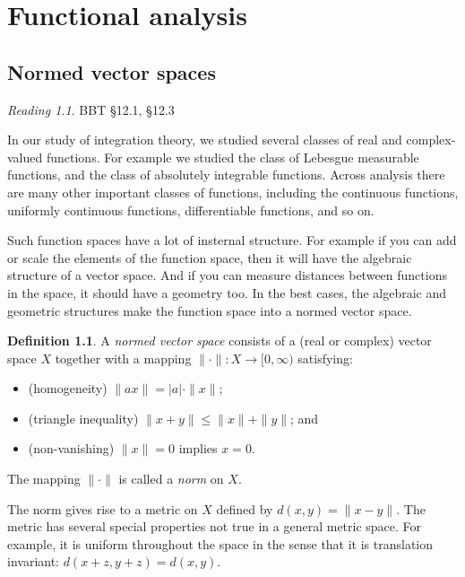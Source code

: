 \documentclass[11pt,oneside]{amsbook}
\theoremstyle{definition}
\theoremstyle{plain}
\theoremstyle{definition}
\newtheorem{defn}[thm]{Definition}
\theoremstyle{remark}
\newtheorem*{reading}{Reading}
\numberwithin{equation}{section}
\numberwithin{figure}{section}
\begin{document}
\chapter{Functional analysis}

\section{Normed vector spaces}

\begin{reading}
  BBT \S 12.1, \S 12.3
\end{reading}

In our study of integration theory, we studied several classes of real and complex-valued functions. For example we studied the class of Lebesgue measurable functions, and the class of absolutely integrable functions. Across analysis there are many other important classes of functions, including the continuous functions, uniformly continuous functions, differentiable functions, and so on.

Such function spaces have a lot of insternal structure. For example if you can add or scale the elements of the function space, then it will have the algebraic structure of a vector space. And if you can measure distances between functions in the space, it should have a geometry too. In the best cases, the algebraic and geometric structures make the function space into a normed vector space.

\begin{defn}
  A \emph{normed vector space} consists of a (real or complex) vector space $X$ together with a mapping $\|\cdot\|\colon X\to[0,\infty)$ satisfying:
  \begin{itemize}
  \item (homogeneity) $\|ax\|=|a|\cdot\|x\|$;
  \item (triangle inequality) $\|x+y\|\leq\|x\|+\|y\|$; and
  \item (non-vanishing) $\|x\|=0$ implies $x=0$.
  \end{itemize}
  The mapping $\|\cdot\|$ is called a \emph{norm} on $X$.
\end{defn}

The norm gives rise to a metric on $X$ defined by $d(x,y)=\|x-y\|$. The metric has several special properties not true in a general metric space. For example, it is uniform throughout the space in the sense that it is translation invariant: $d(x+z,y+z)=d(x,y)$.
\end{document}
